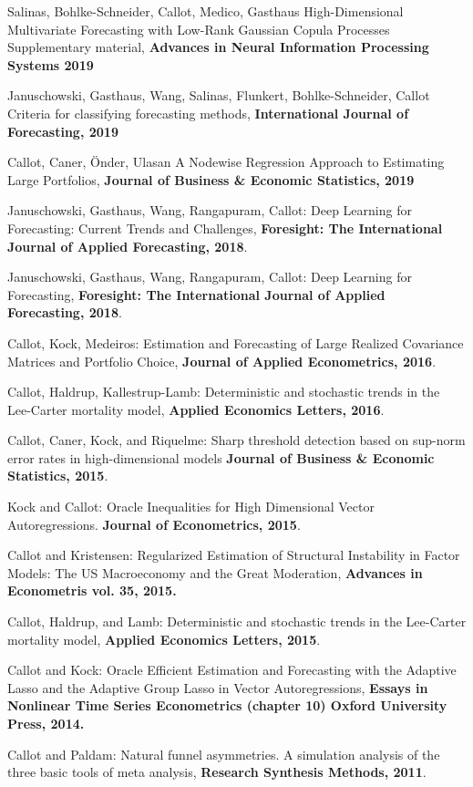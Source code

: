 \documentclass[10pt]{article}
\newenvironment{innerlist}[1][\enskip\textbullet]%
        {\begin{compactitem}[#1]}{\end{compactitem}}
\begin{document}
\begin{innerlist}
\item[Salinas, Bohlke-Schneider, Callot, Medico, Gasthaus] {High-Dimensional Multivariate Forecasting with Low-Rank Gaussian Copula Processes Supplementary material}, \textbf{Advances in Neural Information Processing Systems 2019}

\item[Januschowski, Gasthaus, Wang, Salinas, Flunkert, Bohlke-Schneider, Callot] {Criteria for classifying forecasting methods}, \textbf{International Journal of Forecasting, 2019}
\item[Callot, Caner, Önder, Ulasan] {A Nodewise Regression Approach to Estimating Large Portfolios}, \textbf{Journal of Business \& Economic Statistics, 2019}
\item[Januschowski, Gasthaus, Wang, Rangapuram, Callot:] {Deep Learning for Forecasting: Current Trends and Challenges}, \textbf{Foresight: The International Journal of Applied Forecasting, 2018}.
\item[Januschowski, Gasthaus, Wang, Rangapuram, Callot:] {Deep Learning for Forecasting}, \textbf{Foresight: The International Journal of Applied Forecasting, 2018}.
\item[Callot, Kock, Medeiros:] {Estimation and Forecasting of Large Realized Covariance Matrices and Portfolio Choice}, \textbf{Journal of Applied Econometrics, 2016}.
\item[Callot, Haldrup, Kallestrup-Lamb:] {Deterministic and stochastic trends in the Lee-Carter mortality model}, \textbf{Applied Economics Letters, 2016}.
\item[Callot, Caner, Kock, and Riquelme:] Sharp threshold detection based on sup-norm error rates in high-dimensional models \textbf{Journal of Business \& Economic Statistics, 2015}.
\item[Kock and Callot:] {Oracle Inequalities for High Dimensional Vector Autoregressions}. \textbf{Journal of Econometrics, 2015}.
\item[Callot and Kristensen:] {Regularized Estimation of Structural Instability in Factor Models: The US Macroeconomy and the Great Moderation}, \textbf{Advances in Econometris vol. 35, 2015.}
\item[Callot, Haldrup, and Lamb:] {Deterministic and stochastic trends in the Lee-Carter mortality model}, \textbf{Applied Economics Letters, 2015}.
\item[Callot and Kock:] {Oracle Efficient Estimation and Forecasting with the Adaptive Lasso and the Adaptive Group Lasso in Vector Autoregressions}, \textbf{Essays in Nonlinear Time Series Econometrics (chapter 10) Oxford University Press, 2014.}
\item[Callot and Paldam:] {Natural funnel asymmetries. A simulation analysis of the three basic tools of meta analysis}, \textbf{Research Synthesis Methods, 2011}.
\end{innerlist}
\end{document}
